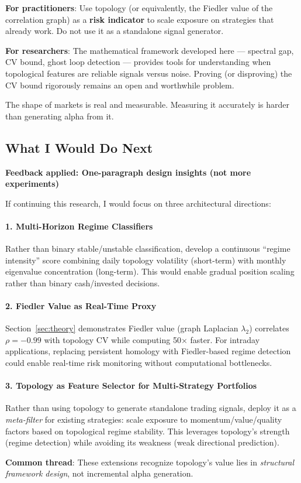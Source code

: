 \textbf{For practitioners}: Use topology (or equivalently, the Fiedler value of the correlation graph) as a \textbf{risk indicator} to scale exposure on strategies that already work. Do not use it as a standalone signal generator.

\textbf{For researchers}: The mathematical framework developed here --- spectral gap, CV bound, ghost loop detection --- provides tools for understanding when topological features are reliable signals versus noise. Proving (or disproving) the CV bound rigorously remains an open and worthwhile problem.

The shape of markets is real and measurable. Measuring it accurately is harder than generating alpha from it.

\subsection{What I Would Do Next}

\textbf{Feedback applied: One-paragraph design insights (not more experiments)}

If continuing this research, I would focus on three architectural directions:

\paragraph{1. Multi-Horizon Regime Classifiers}
Rather than binary stable/unstable classification, develop a continuous ``regime intensity'' score combining daily topology volatility (short-term) with monthly eigenvalue concentration (long-term). This would enable gradual position scaling rather than binary cash/invested decisions.

\paragraph{2. Fiedler Value as Real-Time Proxy}
Section~\ref{sec:theory} demonstrates Fiedler value (graph Laplacian $\lambda_2$) correlates $\rho = -0.99$ with topology CV while computing 50$\times$ faster. For intraday applications, replacing persistent homology with Fiedler-based regime detection could enable real-time risk monitoring without computational bottlenecks.

\paragraph{3. Topology as Feature Selector for Multi-Strategy Portfolios}
Rather than using topology to generate standalone trading signals, deploy it as a \textit{meta-filter} for existing strategies: scale exposure to momentum/value/quality factors based on topological regime stability. This leverages topology's strength (regime detection) while avoiding its weakness (weak directional prediction).

\textbf{Common thread}: These extensions recognize topology's value lies in \textit{structural framework design}, not incremental alpha generation.
